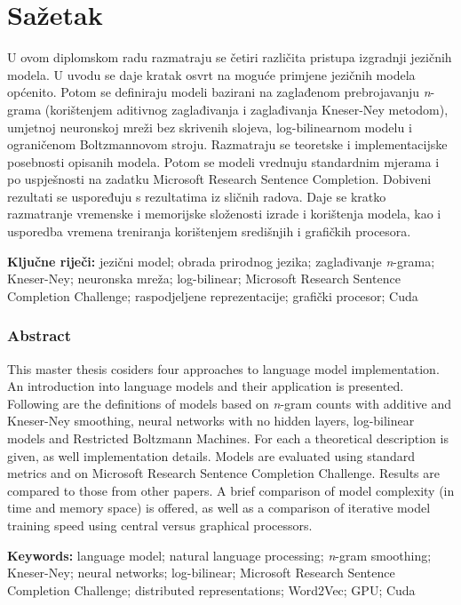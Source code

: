 \documentclass[times, utf8, diplomski, numeric]{fer}
\begin{document}



\chapter{Sažetak}

U ovom diplomskom radu razmatraju se četiri različita pristupa izgradnji jezičnih modela. U uvodu se daje kratak osvrt na moguće primjene jezičnih modela općenito. Potom se definiraju modeli bazirani na zaglađenom prebrojavanju \textit{n}-grama (korištenjem aditivnog zaglađivanja i zaglađivanja Kneser-Ney metodom), umjetnoj neuronskoj mreži bez skrivenih slojeva, log-bilinearnom modelu i ograničenom Boltzmannovom stroju. Razmatraju se teoretske i implementacijske posebnosti opisanih modela. Potom se modeli vrednuju standardnim mjerama i po uspješnosti na zadatku Microsoft Research Sentence Completion. Dobiveni rezultati se uspoređuju s rezultatima iz sličnih radova. Daje se kratko razmatranje vremenske i memorijske složenosti izrade i korištenja modela, kao i usporedba vremena treniranja korištenjem središnjih i grafičkih procesora.

\textbf{Ključne riječi:} jezični model; obrada prirodnog jezika; zaglađivanje \textit{n}-grama; Kneser-Ney; neuronska mreža; log-bilinear; Microsoft Research Sentence Completion Challenge; raspodjeljene reprezentacije; grafički procesor; Cuda

\subsection*{Abstract}

This master thesis cosiders four approaches to language model implementation. An introduction into language models and their application is presented. Following are the definitions of models based on \textit{n}-gram counts with additive and Kneser-Ney smoothing, neural networks with no hidden layers, log-bilinear models and Restricted Boltzmann Machines. For each a theoretical description is given, as well implementation details. Models are evaluated using standard metrics and on Microsoft Research Sentence Completion Challenge. Results are compared to those from other papers. A brief comparison of model complexity (in time and memory space) is offered, as well as a comparison of iterative model training speed using central versus graphical processors.

\textbf{Keywords:} language model; natural language processing; \textit{n}-gram smoothing; Kneser-Ney; neural networks; log-bilinear; Microsoft Research Sentence Completion Challenge; distributed representations; Word2Vec; GPU; Cuda
\end{document}
